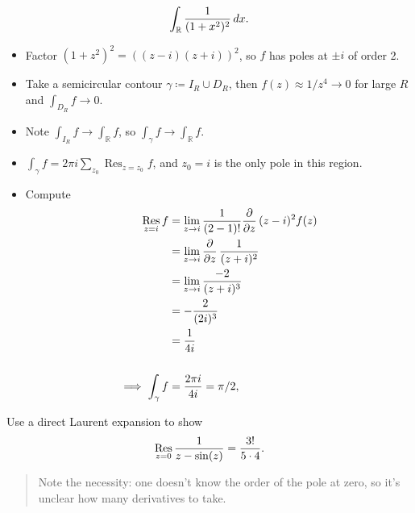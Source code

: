 \begin{exercise}[?]

\begin{align*}
\int_{\mathbb{R}}{1 \over (1+x^2)^2} \,dx
.\end{align*}

\end{exercise}

\begin{solution}

\envlist

\begin{itemize}
\tightlist
\item
  Factor \((1+z^2)^2 = ((z-i)(z+i))^2\), so \(f\) has poles at \(\pm i\)
  of order 2.
\item
  Take a semicircular contour \(\gamma \coloneqq I_R \cup D_R\), then
  \(f(z) \approx 1/z^4 \to 0\) for large \(R\) and
  \(\int_{D_R} f \to 0\).
\item
  Note \(\int_{I_R} f \to \int_{\mathbb{R}}f\), so
  \(\int_\gamma f \to \int_{\mathbb{R}}f\).
\item
  \(\int_\gamma f = 2\pi i \sum_{z_0} \mathop{\mathrm{Res}}_{z=z_0} f\),
  and \(z_0 = i\) is the only pole in this region.
\item
  Compute
  \begin{align*}
  \mathop{\mathrm{Res}}_{z=i} f 
  &= \lim_{z\to i} {1\over (2-1)!} {\frac{\partial }{\partial z}\,} (z-i)^2 f(z) \\
  &= \lim_{z\to i} {\frac{\partial }{\partial z}\,} {1\over (z+i)^2 } \\
  &= \lim_{z\to i} {-2 \over (z+i)^3 } \\
  &= -{2 \over (2i)^3 } \\
  &= {1\over 4i} \\ \\
  \implies
  \int_\gamma f &= {2\pi i \over 4i} = \pi/2
  ,\end{align*}
\end{itemize}

\end{solution}

\begin{exercise}[?]

Use a direct Laurent expansion to show
\begin{align*}
\mathop{\mathrm{Res}}_{z=0} {1\over z-\sin(z)} = {3! \over 5\cdot 4}
.\end{align*}

\begin{quote}
Note the necessity: one doesn't know the order of the pole at zero, so
it's unclear how many derivatives to take.
\end{quote}

\end{exercise}

